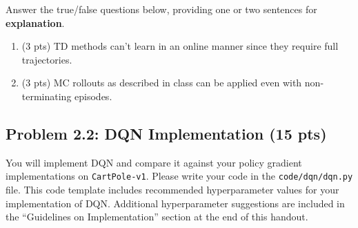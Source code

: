\documentclass[12pt]{article}
\begin{document}
Answer the true/false questions below, providing one or two sentences for \textbf{explanation}.
\begin{enumerate} %
    \item (3 pts) TD methods can't learn in an online manner since they require full trajectories.
    \item (3 pts) MC rollouts as described in class can be applied even with non-terminating episodes.
    
\end{enumerate}

\subsection*{Problem 2.2: DQN Implementation (15 pts)}
You will implement DQN and compare it against your policy gradient implementations on \texttt{CartPole-v1}. Please write your code in the \texttt{code/dqn/dqn.py} file. This code template includes recommended hyperparameter values for your implementation of DQN. Additional hyperparameter suggestions are included in the ``Guidelines on Implementation'' section at the end of this handout.
\end{document}
